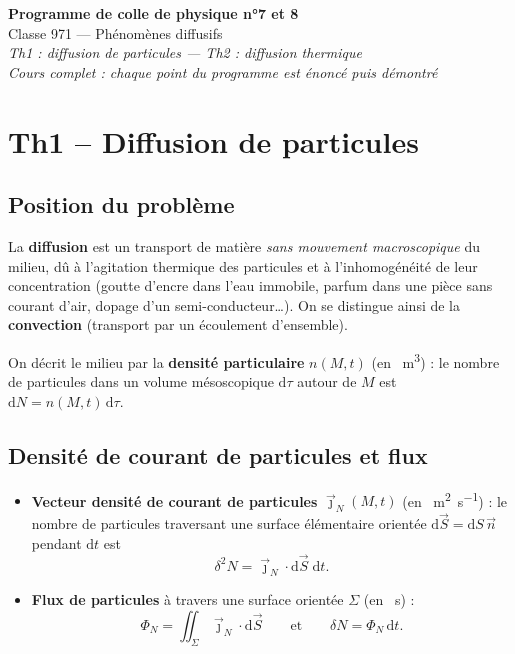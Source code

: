 \documentclass[11pt,a4paper]{article}
\newcommand{\jn}{\vec{\jmath}_N}
\newcommand{\dd}{\mathrm{d}}
\begin{document}
\begin{center}
  {\LARGE\bfseries\color{bleu} Programme de colle de physique n°7 et 8}\\[4pt]
  {\large Classe 971 --- Phénomènes diffusifs}\\[6pt]
  {\itshape Th1 : diffusion de particules --- Th2 : diffusion thermique}\\[2pt]
  {\itshape Cours complet : chaque point du programme est énoncé puis démontré}
\end{center}

\tableofcontents
\newpage

\section{Th1 -- Diffusion de particules}

\subsection{Position du problème}

La \textbf{diffusion} est un transport de matière \emph{sans mouvement macroscopique} du
milieu, dû à l'agitation thermique des particules et à l'inhomogénéité de leur
concentration (goutte d'encre dans l'eau immobile, parfum dans une pièce sans courant d'air,
dopage d'un semi-conducteur\dots). On se distingue ainsi de la \textbf{convection}
(transport par un écoulement d'ensemble).

On décrit le milieu par la \textbf{densité particulaire} $n(M,t)$ (en \si{\per\cubic\metre}) :
le nombre de particules dans un volume mésoscopique $\dd\tau$ autour de $M$ est
$\dd N = n(M,t)\,\dd\tau$.

\subsection{Densité de courant de particules et flux}

\begin{formule}[title={Définitions}]
\begin{itemize}[leftmargin=1.5em]
  \item \textbf{Vecteur densité de courant de particules} $\jn(M,t)$ (en
        \si{\per\square\metre\per\second}) : le nombre de particules traversant une surface
        élémentaire orientée $\dd\vec S=\dd S\,\vec n$ pendant $\dd t$ est
        \[ \delta^2 N = \jn\cdot\dd\vec S\;\dd t. \]
  \item \textbf{Flux de particules} à travers une surface orientée $\Sigma$ (en
        \si{\per\second}) :
        \[ \Phi_N = \iint_{\Sigma}\jn\cdot\dd\vec S
           \qquad\text{et}\qquad \delta N=\Phi_N\,\dd t. \]
\end{itemize}
\end{formule}
\end{document}
